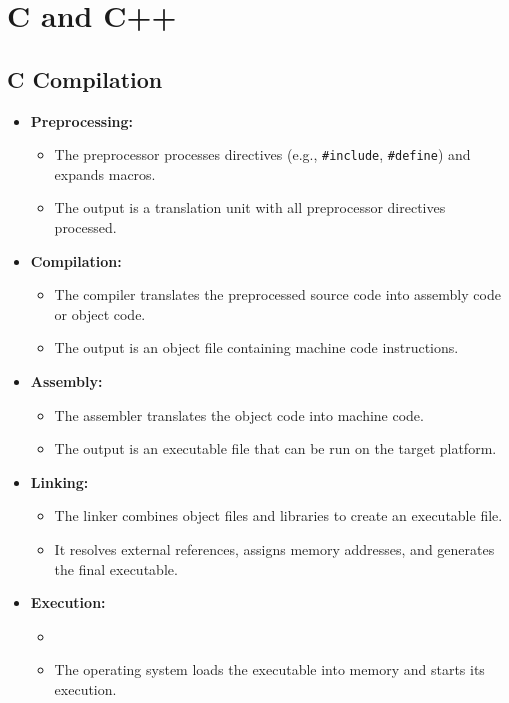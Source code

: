 \documentclass{report}
\begin{document}
\chapter{C and C++}

\section{C Compilation}

\begin{itemize}
	\item \textbf{Preprocessing:}
	      \begin{itemize}
		      \item The preprocessor processes directives (e.g., \texttt{\#include}, \texttt{\#define}) and expands macros.
		      \item The output is a translation unit with all preprocessor directives processed.
	      \end{itemize}
	\item \textbf{Compilation:}
	      \begin{itemize}
		      \item The compiler translates the preprocessed source code into assembly code or object code.
		      \item The output is an object file containing machine code instructions.
	      \end{itemize}
	\item \textbf{Assembly:}
	      \begin{itemize}
		      \item The assembler translates the object code into machine code.
		      \item The output is an executable file that can be run on the target platform.
	      \end{itemize}
	\item \textbf{Linking:}
	      \begin{itemize}
		      \item The linker combines object files and libraries to create an executable file.
		      \item It resolves external references, assigns memory addresses, and generates the final executable.
	      \end{itemize}
	\item \textbf{Execution:}
	      \begin{itemize}
		      \item
		      \item The operating system loads the executable into memory and starts its execution.
	      \end{itemize}
\end{itemize}
\end{document}
